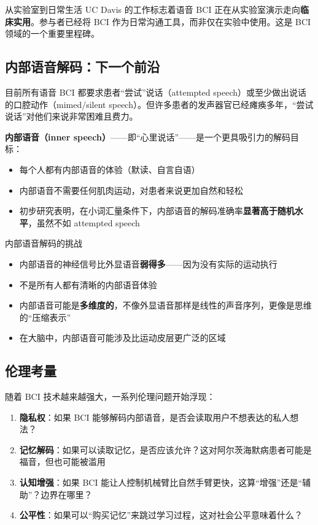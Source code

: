 \documentclass[a4paper]{article}
\begin{document}
\begin{importantbox}{从实验室到日常生活}
UC Davis 的工作标志着语音 BCI 正在从实验室演示走向\textbf{临床实用}。参与者已经将 BCI 作为日常沟通工具，而非仅在实验中使用。这是 BCI 领域的一个重要里程碑。
\end{importantbox}

\subsection{内部语音解码：下一个前沿}

目前所有语音 BCI 都要求患者``尝试''说话（attempted speech）或至少做出说话的口腔动作（mimed/silent speech）。但许多患者的发声器官已经瘫痪多年，``尝试说话''对他们来说非常困难且费力。

\textbf{内部语音（inner speech）}——即``心里说话''——是一个更具吸引力的解码目标：

\begin{itemize}
    \item 每个人都有内部语音的体验（默读、自言自语）
    \item 内部语音不需要任何肌肉运动，对患者来说更加自然和轻松
    \item 初步研究表明，在小词汇量条件下，内部语音的解码准确率\textbf{显著高于随机水平}，虽然不如 attempted speech
\end{itemize}

\begin{warningbox}{内部语音解码的挑战}
\begin{itemize}
    \item 内部语音的神经信号比外显语音\textbf{弱得多}——因为没有实际的运动执行
    \item 不是所有人都有清晰的内部语音体验
    \item 内部语音可能是\textbf{多维度的}，不像外显语音那样是线性的声音序列，更像是思维的``压缩表示''
    \item 在大脑中，内部语音可能涉及比运动皮层更广泛的区域
\end{itemize}
\end{warningbox}

\subsection{伦理考量}

随着 BCI 技术越来越强大，一系列伦理问题开始浮现：

\begin{enumerate}
    \item \textbf{隐私权}：如果 BCI 能够解码内部语音，是否会读取用户不想表达的私人想法？
    \item \textbf{记忆解码}：如果可以读取记忆，是否应该允许？这对阿尔茨海默病患者可能是福音，但也可能被滥用
    \item \textbf{认知增强}：如果 BCI 能让人控制机械臂比自然手臂更快，这算``增强''还是``辅助''？边界在哪里？
    \item \textbf{公平性}：如果可以``购买记忆''来跳过学习过程，这对社会公平意味着什么？
\end{enumerate}
\end{document}
